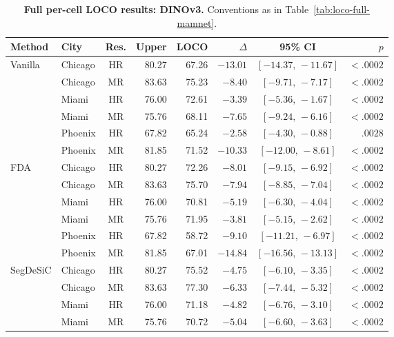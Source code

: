 \begin{table}[h]
\centering
\footnotesize
\setlength{\tabcolsep}{4pt}
\caption{
\textbf{Full per-cell LOCO results: DINOv3.}
Conventions as in Table~\ref{tab:loco-full-mamnet}.
}
\label{tab:loco-full-dinov3}
\begin{tabular}{@{}llcrrrcr@{}}
\toprule
\textbf{Method} & \textbf{City} & \textbf{Res.} & \textbf{Upper} & \textbf{LOCO} & $\Delta$ & \textbf{95\% CI} & $p$ \\
\midrule
Vanilla   & Chicago & HR & 80.27 & 67.26 & $-13.01$ & $[-14.37,\,-11.67]$ & $<\!.0002$ \\
          & Chicago & MR & 83.63 & 75.23 & $-8.40$  & $[-9.71,\,-7.17]$   & $<\!.0002$ \\
          & Miami   & HR & 76.00 & 72.61 & $-3.39$  & $[-5.36,\,-1.67]$   & $<\!.0002$ \\
          & Miami   & MR & 75.76 & 68.11 & $-7.65$  & $[-9.24,\,-6.16]$   & $<\!.0002$ \\
          & Phoenix & HR & 67.82 & 65.24 & $-2.58$  & $[-4.30,\,-0.88]$   & $.0028$ \\
          & Phoenix & MR & 81.85 & 71.52 & $-10.33$ & $[-12.00,\,-8.61]$  & $<\!.0002$ \\
\cmidrule(l){1-8}
FDA       & Chicago & HR & 80.27 & 72.26 & $-8.01$  & $[-9.15,\,-6.92]$   & $<\!.0002$ \\
          & Chicago & MR & 83.63 & 75.70 & $-7.94$  & $[-8.85,\,-7.04]$   & $<\!.0002$ \\
          & Miami   & HR & 76.00 & 70.81 & $-5.19$  & $[-6.30,\,-4.04]$   & $<\!.0002$ \\
          & Miami   & MR & 75.76 & 71.95 & $-3.81$  & $[-5.15,\,-2.62]$   & $<\!.0002$ \\
          & Phoenix & HR & 67.82 & 58.72 & $-9.10$  & $[-11.21,\,-6.97]$  & $<\!.0002$ \\
          & Phoenix & MR & 81.85 & 67.01 & $-14.84$ & $[-16.56,\,-13.13]$ & $<\!.0002$ \\
\cmidrule(l){1-8}
SegDeSiC  & Chicago & HR & 80.27 & 75.52 & $-4.75$  & $[-6.10,\,-3.35]$   & $<\!.0002$ \\
          & Chicago & MR & 83.63 & 77.30 & $-6.33$  & $[-7.44,\,-5.32]$   & $<\!.0002$ \\
          & Miami   & HR & 76.00 & 71.18 & $-4.82$  & $[-6.76,\,-3.10]$   & $<\!.0002$ \\
          & Miami   & MR & 75.76 & 70.72 & $-5.04$  & $[-6.60,\,-3.63]$   & $<\!.0002$ \\

\end{tabular}
\end{table}
